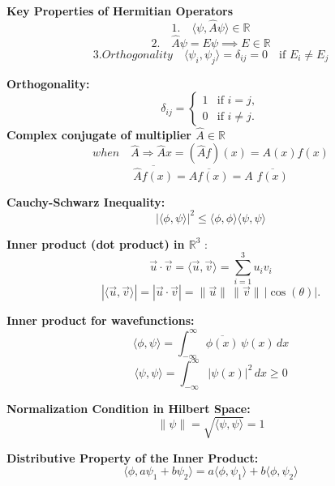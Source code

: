 \documentclass[a4paper,11pt]{article}
\renewcommand{\textbf}[1]{{\scriptsize	\bfseries #1}}
\begin{document}
\begin{footnotesize}
\begin{multicols}{2}
\begin{minipage}{\linewidth}
\textbf{Key Properties of Hermitian Operators}
\[ 1. \quad \langle \psi, \hat{A} \psi \rangle \in \mathbb{R}\]
\[2. \quad \hat{A} \psi = E \psi \implies E \in \mathbb{R}\]
\[ 3.Orthogonality \quad \langle \psi_i, \psi_j \rangle = \delta_{ij}  = 0 \quad \text{if } E_i \neq E_j\]
\end{minipage}
\textbf{Orthogonality:} 
\[
\delta_{ij} = 
\begin{cases} 
1 & \text{if } i = j, \\
0 & \text{if } i \neq j.
\end{cases}
\]
\textbf{Complex conjugate of multiplier $\hat{A} \in \mathbb{R}$} 
\[
when\quad \hat{A} \Rightarrow \hat{A}x = (\hat{A}f)(x) = A(x)f(x) 
\]
\[
\overline{\hat{A} f(x)}= \overline{A f(x)} = A \,\,\overline{f(x)}
\]
\textbf{} 


\begin{minipage}{\linewidth}

\textbf{Cauchy-Schwarz Inequality:} \\[-0.2cm]
\[
|\langle \phi, \psi \rangle|^2 \leq \langle \phi, \phi \rangle \langle \psi, \psi \rangle
\]

\end{minipage}


\begin{minipage}{\linewidth}
\textbf{Inner product (dot product) in $\mathbb{R}^3$ } :
\[
\vec{u} \cdot \vec{v} = \langle \vec{u}, \vec{v} \rangle = \sum_{i=1}^{3} u_i v_i
\]
\[
|\langle \vec{u}, \vec{v} \rangle| = |\vec{u} \cdot \vec{v}| = \|\vec{u}\| \, \|\vec{v}\| \, |\cos(\theta)|.
\]

\end{minipage}



\begin{minipage}{\linewidth}
\textbf{Inner product for wavefunctions:}
\[
\langle \phi, \psi \rangle = \int_{-\infty}^{\infty} \overline{ \phi(x)} \, \psi(x) \, dx
\]
\[
\langle \psi, \psi \rangle = \int_{-\infty}^{\infty} |\psi(x)|^2 \, dx \geq 0
\]
\end{minipage}
\begin{minipage}{\linewidth}
\textbf{Normalization Condition in Hilbert Space:} \\[-0.2cm]
\[
\|\psi\| = \sqrt{\langle \psi, \psi \rangle} = 1
\]
\end{minipage}
\begin{minipage}{\linewidth}
\textbf{Distributive Property of the Inner Product:}
\[
\langle \phi, a\psi_1 + b\psi_2 \rangle = a \langle \phi, \psi_1 \rangle + b \langle \phi, \psi_2 \rangle
\]


\end{minipage}
\end{multicols}
\end{footnotesize}
\end{document}
